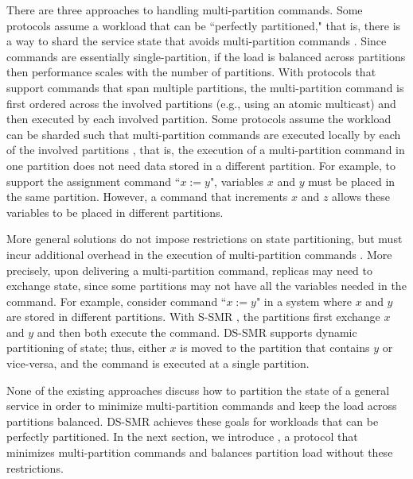 There are three approaches to handling multi-partition commands.
Some protocols assume a workload that can be ``perfectly partitioned," that is, there is a way to shard the service state that avoids multi-partition commands \cite{hoang2016,Nogueira17}.
Since commands are essentially single-partition, if the load is balanced across partitions then performance scales with the number of partitions.
With protocols that support commands that span multiple partitions, the multi-partition command is first ordered across the involved partitions (e.g., using an atomic multicast) and then executed by each involved partition.
Some protocols assume the workload can be sharded such that multi-partition commands are executed locally by each of the involved partitions \cite{Mu2016}, that is, the execution of a multi-partition command in one partition does not need data stored in a different partition.
For example, to support the assignment command ``$x := y$", variables $x$ and $y$ must be placed in the same partition.
However, a command that increments $x$ and $z$ allows these variables to be placed in different partitions.

More general solutions do not impose restrictions on state partitioning, but must incur additional overhead in the execution of multi-partition commands \cite{bezerra2014ssmr, hoang2016}.
More precisely, upon delivering a multi-partition command, replicas may need to exchange state, since some partitions may not have all the variables needed in the command.
For example, consider command ``$x := y$" in a system where $x$ and $y$ are stored in different partitions.
With S-SMR \cite{bezerra2014ssmr}, the partitions first exchange $x$ and $y$ and then both execute the command.
DS-SMR \cite{hoang2016} supports dynamic partitioning of state; thus, either $x$ is moved to the partition that contains $y$ or vice-versa, and the command is executed at a single partition.

None of the existing approaches discuss how to partition the state of a general service in order to minimize multi-partition commands and keep the load across partitions balanced.
DS-SMR \cite{hoang2016} achieves these goals for workloads that can be perfectly partitioned.
In the next section, we introduce \dynastar, a protocol that minimizes multi-partition commands and balances partition load without these restrictions. 


